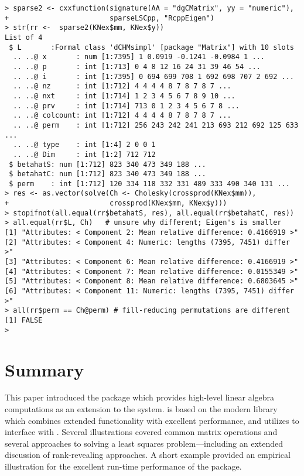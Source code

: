 \documentclass[shortnames,article]{jss}
\begin{document}
\begin{verbatim}
> sparse2 <- cxxfunction(signature(AA = "dgCMatrix", yy = "numeric"),
+                        sparseLSCpp, "RcppEigen")
> str(rr <-  sparse2(KNex$mm, KNex$y))
List of 4
 $ L       :Formal class 'dCHMsimpl' [package "Matrix"] with 10 slots
  .. ..@ x       : num [1:7395] 1 0.0919 -0.1241 -0.0984 1 ...
  .. ..@ p       : int [1:713] 0 4 8 12 16 24 31 39 46 54 ...
  .. ..@ i       : int [1:7395] 0 694 699 708 1 692 698 707 2 692 ...
  .. ..@ nz      : int [1:712] 4 4 4 4 8 7 8 7 8 7 ...
  .. ..@ nxt     : int [1:714] 1 2 3 4 5 6 7 8 9 10 ...
  .. ..@ prv     : int [1:714] 713 0 1 2 3 4 5 6 7 8 ...
  .. ..@ colcount: int [1:712] 4 4 4 4 8 7 8 7 8 7 ...
  .. ..@ perm    : int [1:712] 256 243 242 241 213 693 212 692 125 633 ...
  .. ..@ type    : int [1:4] 2 0 0 1
  .. ..@ Dim     : int [1:2] 712 712
 $ betahatS: num [1:712] 823 340 473 349 188 ...
 $ betahatC: num [1:712] 823 340 473 349 188 ...
 $ perm    : int [1:712] 120 334 118 332 331 489 333 490 340 131 ...
> res <- as.vector(solve(Ch <- Cholesky(crossprod(KNex$mm)),
+                        crossprod(KNex$mm, KNex$y)))
> stopifnot(all.equal(rr$betahatS, res), all.equal(rr$betahatC, res))
> all.equal(rr$L, Ch)   # unsure why different; Eigen's is smaller
[1] "Attributes: < Component 2: Mean relative difference: 0.4166919 >"  
[2] "Attributes: < Component 4: Numeric: lengths (7395, 7451) differ >" 
[3] "Attributes: < Component 6: Mean relative difference: 0.4166919 >"  
[4] "Attributes: < Component 7: Mean relative difference: 0.0155349 >"  
[5] "Attributes: < Component 8: Mean relative difference: 0.6803645 >"  
[6] "Attributes: < Component 11: Numeric: lengths (7395, 7451) differ >"
> all(rr$perm == Ch@perm) # fill-reducing permutations are different
[1] FALSE
> 
\end{verbatim}

\section{Summary}

This paper introduced the  package which provides high-level
linear algebra computations as an extension to the  system.
 is based on the modern  library 
which combines extended functionality with excellent performance, and
utilizes  to interface  with .
Several illustrations covered common matrix operations and
several approaches to solving a least squares problem---including an extended
discussion of rank-revealing approaches.  A short example provided
an empirical illustration  for the excellent run-time performance of the
 package.


\end{document}
